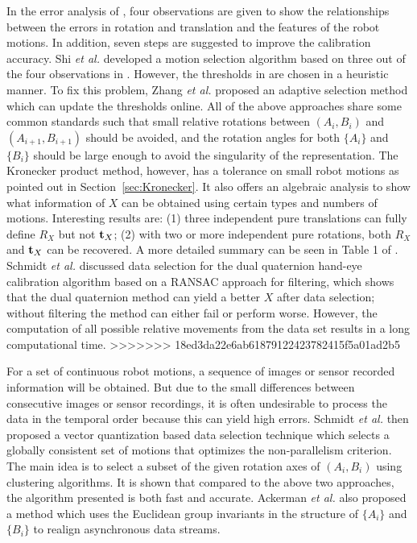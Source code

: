 \documentclass[twocolumn,10pt]{asme2ej}
\newcommand{\ttt}{{\bf t}}
\begin{document}
In the error analysis of \cite{tsai1989new}, four observations are given to show the relationships between the errors in rotation and translation and the features of the robot motions. In addition, seven steps are suggested to improve the calibration accuracy. Shi {\it{et al.}} \cite{shi2005approach} developed a motion selection algorithm based on three out of the four observations in \cite{tsai1989new}. However, the thresholds in \cite{shi2005approach} are chosen in a heuristic manner. To fix this problem,  Zhang {\it{et al.}} \cite{zhang2005adaptive} proposed an adaptive selection method which can update the thresholds online. All of the above approaches share some common standards such that small relative rotations between $(A_i, B_i)$ and $(A_{i+1}, B_{i+1})$ should be avoided, and the rotation angles for both $\{A_i\}$ and $\{B_i\}$ should be large enough to avoid the singularity of the representation. The Kronecker product method, however, has a tolerance on small robot motions as pointed out in Section~\ref{sec:Kronecker}. It also offers an algebraic analysis to show what information of $X$ can be obtained using certain types and numbers of motions. Interesting results are: (1) three independent pure translations can fully define $R_X$ but not $\ttt_{X}$; (2) with two or more independent pure rotations, both $R_{X}$ and $\ttt_{X}$ can be recovered. A more detailed summary can be seen in Table 1 of \cite{andreff1999line}. Schmidt {\it{et al.}} \cite{schmidt2003robust} discussed data selection for the dual quaternion hand-eye calibration algorithm based on a RANSAC approach for filtering, which shows that the dual quaternion method can yield a better $X$ after data selection; without filtering the method can either fail or perform worse. However, the computation of all possible relative movements from the data set results in a long computational time. 
>>>>>>> 18ed3da22e6ab61879122423782415f5a01ad2b5

For a set of continuous robot motions, a sequence of images or sensor recorded information will be obtained. But due to the small differences between consecutive images or sensor recordings, it is often undesirable to process the data in the temporal order because this can yield high errors. Schmidt {\it{et al.}} \cite{vogt2004vector} then proposed a vector quantization based data selection technique which selects a globally consistent set of motions that optimizes the non-parallelism criterion. The main idea is to select a subset of the given rotation axes of $(A_i, B_i)$ using clustering algorithms. It is shown that compared to the above two approaches, the algorithm presented is both fast and accurate. Ackerman {\it{et al.}} \cite{ackermanIROS2013} also proposed a method which uses the Euclidean group invariants in the structure of $\{A_i\}$ and $\{B_i\}$ to realign asynchronous data streams.
\end{document}
